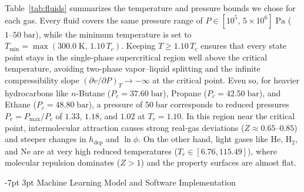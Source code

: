\documentclass[10pt,a4paper]{article}
\makeatletter
\renewcommand\section{\@startsection {section}{1}{\z@}%
  {-7pt \@plus -2pt \@minus -1pt}%
  {3pt \@plus 1pt}%
  {\normalfont\large\bfseries\color{darkslate}}}
\makeatother
\begin{document}
Table~\ref{tab:fluids} summarizes the temperature and pressure bounds we chose for each gas. Every fluid covers the same pressure range of $P \in [10^5,\, 5\times 10^6]\;\mathrm{Pa}$ ($1\text{--}50\;\mathrm{bar}$), while the minimum temperature is set to $T_{\min} = \max(300.0\;\mathrm{K},\, 1.10\,T_c)$. Keeping $T \ge 1.10\,T_c$ ensures that every state point stays in the single-phase supercritical region well above the critical temperature, avoiding two-phase vapor--liquid splitting and the infinite compressibility slope $(\partial v/\partial P)_T \to -\infty$ at the critical point. Even so, for heavier hydrocarbons like $n$-Butane ($P_c = 37.60\;\mathrm{bar}$), Propane ($P_c = 42.50\;\mathrm{bar}$), and Ethane ($P_c = 48.80\;\mathrm{bar}$), a pressure of $50\;\mathrm{bar}$ corresponds to reduced pressures $P_r = P_{\max}/P_c$ of $1.33$, $1.18$, and $1.02$ at $T_r = 1.10$. In this region near the critical point, intermolecular attraction causes strong real-gas deviations ($Z \approx 0.65\text{--}0.85$) and steeper changes in $h_{\mathrm{dep}}$ and $\ln\phi$. On the other hand, light gases like $\mathrm{He}$, $\mathrm{H_2}$, and $\mathrm{Ne}$ are at very high reduced temperatures ($T_r \in [6.76, 115.49]$), where molecular repulsion dominates ($Z > 1$) and the property surfaces are almost flat.

\section{Machine Learning Model and Software Implementation}
\end{document}
